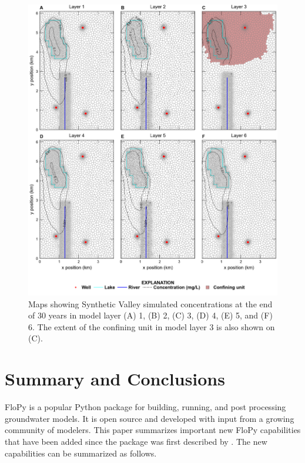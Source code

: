 \documentclass[11pt, oneside]{article}  	%
\begin{document}
\begin{figure}[ht!]
	\begin{center}
		\includegraphics{figures/mv_voronoi_map_concentration.png}
	\end{center}
	\caption{Maps showing Synthetic Valley simulated concentrations at the end of 30 years in model layer (A) 1, (B) 2, (C) 3, (D) 4, (E) 5, and (F) 6. The extent of the confining unit in model layer 3 is also shown on (C).}
	\label{fig:mvxsection}
\end{figure}

\section{Summary and Conclusions}
FloPy is a popular Python package for building, running, and post processing groundwater models. It is open source and developed with input from a growing community of modelers. This paper summarizes important new FloPy capabilities that have been added since the package was first described by \citep{bakker2016scripting}. The new capabilities can be summarized as follows.
\end{document}
